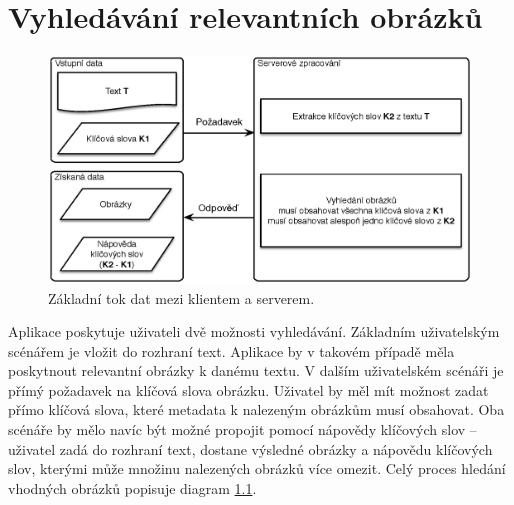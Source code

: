 \chapter{Vyhledávání relevantních obrázků}
\label{chap:teorie}





\begin{figure}[h]
  \centering
  \includegraphics[width=150mm]{dataflow.eps}
  \caption{Základní tok dat mezi klientem a serverem.}
  \label{fig:dataflow}
\end{figure}


Aplikace poskytuje uživateli dvě možnosti vyhledávání. Základním uživatelským scénářem je vložit do rozhraní text. Aplikace by v takovém případě měla poskytnout relevantní obrázky k danému textu. V dalším uživatelském scénáři je přímý požadavek na klíčová slova obrázku. Uživatel by měl mít možnost zadat přímo klíčová slova, které metadata k nalezeným obrázkům musí obsahovat. Oba scénáře by mělo navíc být možné propojit pomocí nápovědy klíčových slov -- uživatel zadá do rozhraní text, dostane výsledné obrázky a nápovědu klíčových slov, kterými může množinu nalezených obrázků více omezit. Celý proces hledání vhodných obrázků popisuje diagram \ref{fig:dataflow}.

